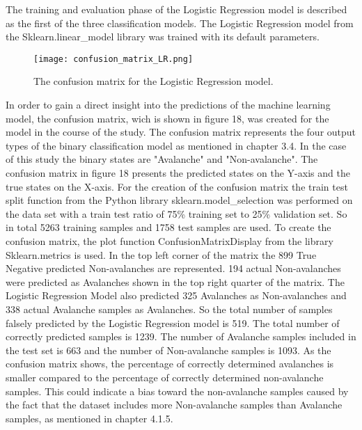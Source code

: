 \documentclass[../masterarbeit.tex]{subfiles}
\begin{document}
The training and evaluation phase of the Logistic Regression model is described as the first of the three classification models. The Logistic Regression model from the Sklearn.linear\_model library \textcite[]{Scikit-learn-logistic-regression:2022} was trained with its default parameters. \\
\begin{figure}[h]
    \centering
    \texttt{[image: confusion\_matrix\_LR.png]}
    \caption{The confusion matrix for the Logistic Regression model.}
\end{figure}
In order to gain a direct insight into the predictions of the machine learning model, the confusion matrix, wich is shown in figure 18, was created for the model in the course of the study. The confusion matrix represents the four output types of the binary classification model as mentioned in chapter 3.4. In the case of this study the binary states are "Avalanche" and "Non-avalanche". The confusion matrix in figure 18 presents the predicted states on the Y-axis and the true states on the X-axis. For the creation of the confusion matrix the train test split function from the Python library sklearn.model\_selection \textcite[]{Scikit-learn-train-test-split:2022} was performed on the data set with a train test ratio of 75\% training set to 25\% validation set. So in total 5263 training samples and 1758 test samples are used. To create the confusion matrix, the plot function ConfusionMatrixDisplay \textcite[]{Scikit-learn-confusion-matrix:2022} from the library Sklearn.metrics is used. In the top left corner of the matrix the 899 True Negative predicted Non-avalanches are represented. 194 actual Non-avalanches were predicted as Avalanches shown in the top right quarter of the matrix. The Logistic Regression Model also predicted 325 Avalanches as Non-avalanches and 338 actual Avalanche samples as Avalanches. So the total number of samples falsely predicted by the Logistic Regression model is 519. The total number of correctly predicted samples is 1239. The number of Avalanche samples included in the test set is 663 and the number of Non-avalanche samples is 1093. As the confusion matrix shows, the percentage of correctly determined avalanches is smaller compared to the percentage of correctly determined non-avalanche samples. This could indicate a bias toward the non-avalanche samples caused by the fact that the dataset includes more Non-avalanche samples than Avalanche samples, as mentioned in chapter 4.1.5. \\~\\
\end{document}
